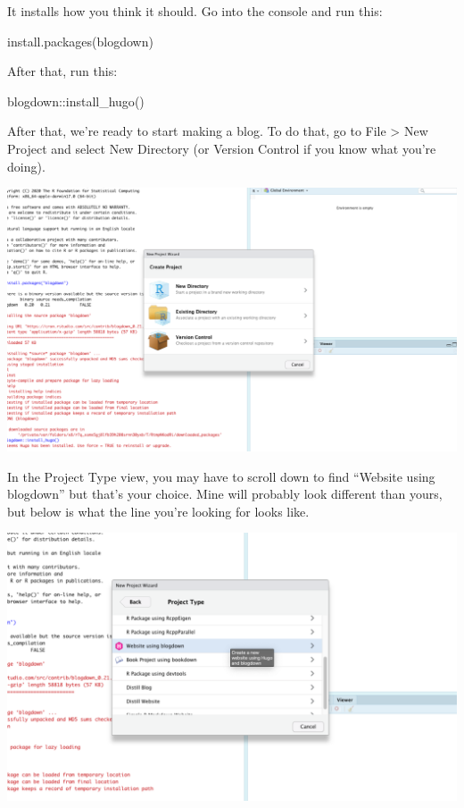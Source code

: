 \documentclass[
]{book}
\newenvironment{Shaded}{\begin{snugshade}}{\end{snugshade}}
\newcommand{\FunctionTok}[1]{\textcolor[rgb]{0.00,0.00,0.00}{#1}}
\newcommand{\NormalTok}[1]{#1}
\newcommand{\SpecialCharTok}[1]{\textcolor[rgb]{0.00,0.00,0.00}{#1}}
\newcommand{\StringTok}[1]{\textcolor[rgb]{0.31,0.60,0.02}{#1}}
\begin{document}
It installs how you think it should. Go into the console and run this:

\begin{Shaded}
\begin{Highlighting}[]
\FunctionTok{install.packages}\NormalTok{(}\StringTok{\textquotesingle{}blogdown\textquotesingle{}}\NormalTok{) }
\end{Highlighting}
\end{Shaded}

After that, run this:

\begin{Shaded}
\begin{Highlighting}[]
\NormalTok{blogdown}\SpecialCharTok{::}\FunctionTok{install\_hugo}\NormalTok{()}
\end{Highlighting}
\end{Shaded}

After that, we're ready to start making a blog. To do that, go to File \textgreater{} New Project and select New Directory (or Version Control if you know what you're doing).

\includegraphics[width=19.61in]{images/blog1}

In the Project Type view, you may have to scroll down to find ``Website using blogdown'' but that's your choice. Mine will probably look different than yours, but below is what the line you're looking for looks like.

\includegraphics[width=15.39in]{images/blog2}
\end{document}
